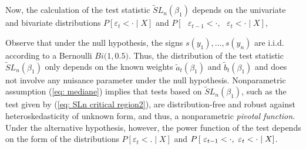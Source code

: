 \documentclass[harvard,11pt]{article}
\begin{document}
Now, the calculation of the test statistic $\tilde{S}L_{n}(\beta _{1})$
depends on the univariate and bivariate distributions $%
P\left[ \varepsilon_{t}<\cdot \mid X \right] $ and $P\left[ \text{ }%
\varepsilon_{t-1}<\cdot ,\text{ }\varepsilon_{t}<\cdot \mid X\right]$,

\begin{sloppypar}
Observe that under the null hypothesis, the signs $s(y_{1}),...
,s(y_{n})$ are i.i.d. according to a Bernoulli $Bi(1,$\thinspace $0.5)$.
Thus, the distribution of the test statistic $\tilde{S}L_{n}(\beta _{1})$
only depends on the known weights $\tilde{a}_{t}(\beta _{1})$ and $\tilde{b}%
_{t}(\beta _{1})$ and does not involve any nuisance parameter under the null
hypothesis. Nonparametric assumption (\ref{eq:
mediane}) implies that tests based on $\tilde{S}L_{n}(\beta _{1})$, such
as the test given by (\ref{eq: SLn critical region2}), are distribution-free
and robust against heteroskedasticity of unknown form, and thus, a nonparametric 
\emph{pivotal function}. Under the alternative hypothesis, however, the
power function of the test depends on the form of the distributions $P\left[\varepsilon_t<.\mid X\right]$ and $P\left[ \text{ }\varepsilon_{t-1}<\cdot ,\-
\text{ }\varepsilon_{t}<\cdot \mid X\right]$.
\end{sloppypar}
\end{document}
